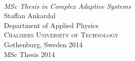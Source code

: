 \begin{titlepage}

\mbox{}
\vfill
\addtolength{\voffset}{2cm}
\begin{flushleft}
	{ \\[0.5cm]
	\emph{\Large MSc Thesis in Complex Adaptive Systems} \\[.8cm]
	
	{\huge Staffan Ankardal}\\[.8cm]
	
	{\Large Department of Applied Physics\\
	\textsc{Chalmers University of Technology} \\
	Gothenburg, Sweden 2014 \\
	MSc Thesis 2014\\
	} 
	}
\end{flushleft}

\end{titlepage}
\ClearShipoutPicture

